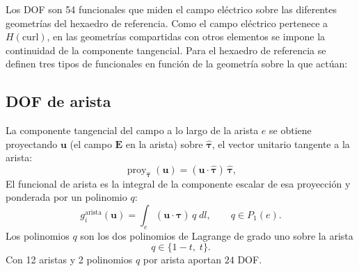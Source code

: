 \documentclass[12pt]{report} %
\begin{document}
Los DOF son 54 funcionales que miden el campo eléctrico sobre las diferentes geometrías del hexaedro de referencia. Como el campo eléctrico pertenece a $H(\mathrm{curl})$, en las geometrías compartidas con otros elementos se impone la continuidad de la componente tangencial. Para el hexaedro de referencia se definen tres tipos de funcionales en función de la geometría sobre la que actúan:

\subsection{DOF de arista}\label{subsec:dof-arista}
La componente tangencial del campo a lo largo de la arista $e$ se obtiene proyectando $\mathbf{u}$ (el campo $\mathbf{E}$ en la arista) sobre $\hat{\boldsymbol{\tau}}$, el vector unitario tangente a la arista:
\begin{equation}\label{eq:proyeccion}
 \operatorname{proy}_{\hat{\boldsymbol{\tau}}}(\mathbf{u}) = (\mathbf{u}\cdot\hat{\boldsymbol{\tau}})\,\hat{\boldsymbol{\tau}},
\end{equation}
El funcional de arista es la integral de la componente escalar de esa proyecci\'on y ponderada por un polinomio $q$:
\begin{equation}\label{eq:dof-arista}
 g_i^{\text{arista}}(\mathbf{u}) = \int_{e} (\mathbf{u}\cdot\hat{\boldsymbol{\tau}})\, q \; dl,
 \qquad q\in P_1(e).
\end{equation}
Los polinomios $q$ son los dos polinomios de Lagrange de grado uno sobre la arista
\begin{equation*}
	q\in\{1-t,\; t\}.
\end{equation*}
Con 12 aristas y 2 polinomios $q$ por arista aportan $24$ DOF.
\end{document}
